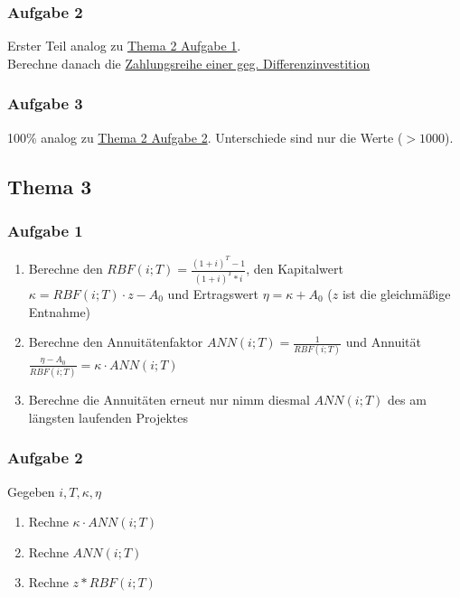 \documentclass[12pt]{article}
\begin{document}
		\subsubsection*{Aufgabe 2}\label{Thema2Aufgabe2}
		Erster Teil analog zu \hyperref[Thema2Aufgabe1]{Thema 2 Aufgabe 1}. \\
		Berechne danach die \hyperref[ZahlungsreiheEinerDifferenzinvestition]{Zahlungsreihe einer geg. Differenzinvestition}
		\subsubsection*{Aufgabe 3}
		100\% analog zu \hyperref[Thema2Aufgabe2]{Thema 2 Aufgabe 2}. Unterschiede sind nur die Werte ($> 1000$).
	\subsection*{Thema 3}
		\subsubsection*{Aufgabe 1}
		\begin{enumerate}
			\item Berechne den $RBF(i;T)=\frac{(1+i)^T-1}{(1+i)^T*i}$, den Kapitalwert $\kappa=RBF(i;T)\cdot z -A_0$ und Ertragswert $\eta = \kappa + A_0$ ($z$ ist die gleichmäßige Entnahme)
			\item Berechne den Annuitätenfaktor $ANN(i;T)=\frac{1}{RBF(i;T)}$ und Annuität $\frac{\eta-A_0}{RBF(i;T)} = \kappa\cdot ANN(i;T)$
			\item Berechne die Annuitäten erneut nur nimm diesmal $ANN(i;T)$ des am längsten laufenden Projektes
		\end{enumerate}
		\subsubsection*{Aufgabe 2}
		Gegeben $i, T, \kappa, \eta$
		\begin{enumerate}[label=\alph*)]
			\item Rechne $\kappa \cdot ANN(i;T)$
			\item Rechne $ANN(i;T)$
			\item Rechne $z*RBF(i;T)$
		\end{enumerate}
\end{document}
